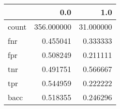 \begin{tabular}{lrr}
\toprule
{} &         0.0 &        1.0 \\
\midrule
count &  356.000000 &  31.000000 \\
fnr   &    0.455041 &   0.333333 \\
fpr   &    0.508249 &   0.211111 \\
tnr   &    0.491751 &   0.566667 \\
tpr   &    0.544959 &   0.222222 \\
bacc  &    0.518355 &   0.246296 \\
\bottomrule
\end{tabular}
